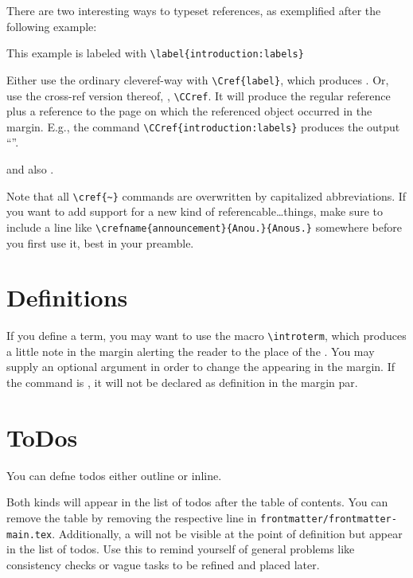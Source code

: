 There are two interesting ways to typeset references, as exemplified after the following example:
\begin{example}\label{introduction:labels}
	This example is labeled with \lstinline|\label{introduction:labels}|
\end{example}

Either use the ordinary cleveref-way with \lstinline|\Cref{label}|, which produces .
Or, use the cross-ref version thereof, \ie, \lstinline!\CCref!. 
It will produce the regular reference plus a reference to the page on which the referenced object occurred in the margin.
E.g., the command \lstinline!\CCref{introduction:labels}! produces the output ``''.

 and also .

Note that all \lstinline|\cref{~}| commands are overwritten by capitalized abbreviations. 
If you want to add support for a new kind of referencable\dots things, make sure to include a line like \lstinline!\crefname{announcement}{Anou.}{Anous.}! somewhere before you first use it, best in your preamble.

\section{Definitions}\label{introduction:definitions}

If you define a term, you may want to use the macro \lstinline{\introterm}, which produces a little note in the margin alerting the reader to the place of the .
You may supply an optional argument in order to change the  appearing in the margin. If the command is , it will not be declared as definition in the margin par.

\section{ToDos}\label{introduction:todos}
You can defne todos either outline or inline. 

Both kinds will appear in the list of todos after the table of contents. You can remove the table by removing the respective line in \lstinline{frontmatter/frontmatter-main.tex}.
Additionally, a  will not be visible at the point of definition but appear in the list of todos. Use this to remind yourself of general problems like consistency checks or vague tasks to be refined and placed later. 

